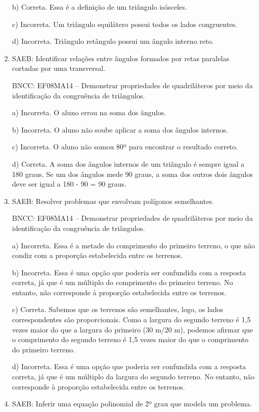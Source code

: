 \begin{enumerate}
b) Correta. Essa é a definição de um triângulo isósceles.

c) Incorreta. Um triângulo equilátero possui todos os lados
congruentes.

d) Incorreta. Triângulo retângulo possui um ângulo interno reto.

\item SAEB: Identificar relações entre ângulos formados por retas paralelas
cortadas por uma transversal.

BNCC: EF08MA14 -- Demonstrar propriedades de quadriláteros por meio da
identificação da congruência de triângulos.

a) Incorreta. O aluno errou na soma dos ângulos.

b) Incorreta. O aluno não soube aplicar a soma dos ângulos
internos.

c) Incorreta. O aluno não somou 80º para encontrar o resultado
correto.

d) Correta. A soma dos ângulos internos de um triângulo é sempre
igual a 180 graus. Se um dos ângulos mede 90 graus, a soma dos outros
dois ângulos deve ser igual a 180 - 90 = 90 graus.
\item SAEB: Resolver problemas que envolvam polígonos semelhantes.

BNCC: EF08MA14 -- Demonstrar propriedades de quadriláteros por meio da
identificação da congruência de triângulos.

a) Incorreta. Essa é a metade do comprimento do primeiro terreno, o
que não condiz com a proporção estabelecida entre os terrenos.

b) Incorreta. Essa é uma opção que poderia ser confundida com a
resposta correta, já que é um múltiplo do comprimento do primeiro
terreno. No entanto, não corresponde à proporção estabelecida entre os
terrenos.

c) Correta. Sabemos que os terrenos são semelhantes, logo, os lados
correspondentes são proporcionais. Como a largura do segundo terreno é
1,5 vezes maior do que a largura do primeiro (30 m/20 m), podemos
afirmar que o comprimento do segundo terreno é 1,5 vezes maior do que o
comprimento do primeiro terreno.

d) Incorreta. Essa é uma opção que poderia ser confundida com a
resposta correta, já que é um múltiplo da largura do segundo terreno. No
entanto, não corresponde à proporção estabelecida entre os terrenos.
\item SAEB: Inferir uma equação polinomial de 2º grau que modela um problema.


\end{enumerate}
